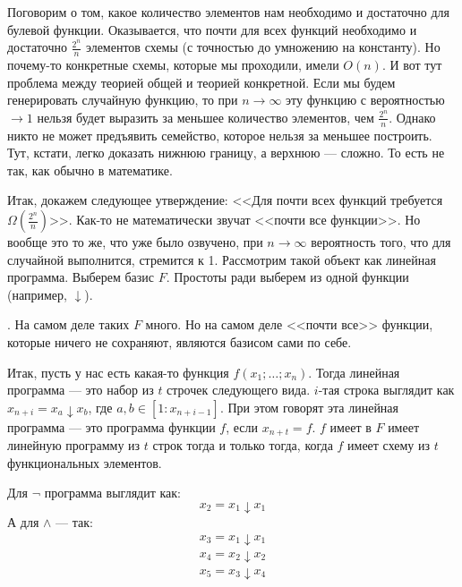\documentclass{article}
\begin{document}
\begin{itemize}
        \begin{Comment}
            Поговорим о том, какое количество элементов нам необходимо и достаточно для булевой функции. Оказывается, что почти для всех функций необходимо и достаточно $\frac{2^n}n$ элементов схемы (с точностью до умножению на константу). Но почему-то конкретные схемы, которые мы проходили, имели $O(n)$. И вот тут проблема между теорией общей и теорией конкретной. Если мы будем генерировать случайную функцию, то при $n\to\infty$ эту функцию с вероятностью $\to1$ нельзя будет выразить за меньшее количество элементов, чем $\frac{2^n}n$. Однако никто не может предъявить семейство, которое нельзя за меньшее построить. Тут, кстати, легко доказать нижнюю границу, а верхнюю --- сложно. То есть не так, как обычно в математике.
        \end{Comment}
        \thm Итак, докажем следующее утверждение: <<Для почти всех функций требуется $\varOmega\left(\frac{2^n}n\right)$>>. Как-то не математически звучат <<почти все функции>>. Но вообще это то же, что уже было озвучено, при $n\to\infty$ вероятность того, что для случайной выполнится, стремится к 1.
        \dfn Рассмотрим такой объект как линейная программа. Выберем базис $F$. Простоты ради выберем из одной функции (например, $\downarrow$).
        \begin{Comment}.
            На самом деле таких $F$ много. Но на самом деле <<почти все>> функции, которые ничего не сохраняют, являются базисом сами по себе.
        \end{Comment}
        Итак, пусть у нас есть какая-то функция $f(x_1;\ldots;x_n)$. Тогда линейная программа --- это набор из $t$ строчек следующего вида. $i$-тая строка выглядит как $x_{n+i}=x_a\downarrow x_b$, где $a,b\in[1:x_{n+i-1}]$. При этом говорят эта линейная программа --- это программа функции $f$, если $x_{n+t}=f$.
        \thm $f$ имеет в $F$ имеет линейную программу из $t$ строк тогда и только тогда, когда $f$ имеет схему из $t$ функциональных элементов.
        \begin{Example}
            Для $\neg$ программа выглядит как:
            \[
            x_2=x_1\downarrow x_1
            \]
            А для $\land$ --- так:
            \[\begin{split}
                x_3=x_1\downarrow x_1\\
                x_4=x_2\downarrow x_2\\
                x_5=x_3\downarrow x_4
            \end{split}\]
        \end{Example}

\end{itemize}
\end{document}
